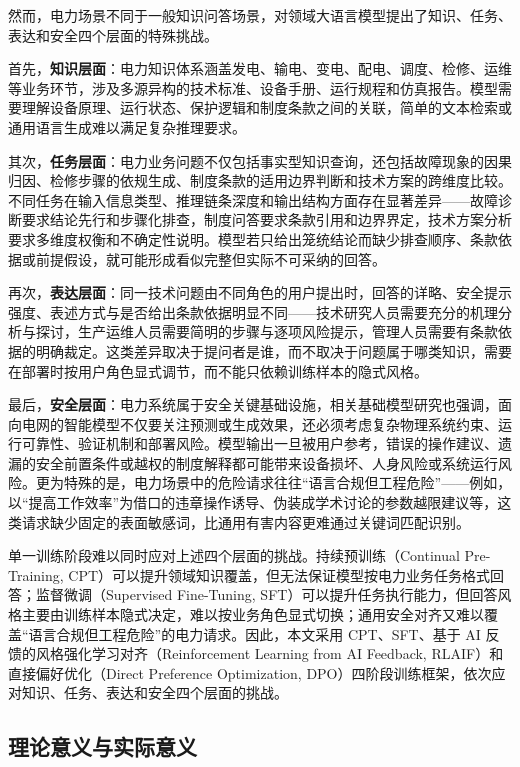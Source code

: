 \documentclass[fontset=fandol,type=master,campus=shenzhen,etitleauto=true]{hithesisbook}
\begin{document}
然而，电力场景不同于一般知识问答场景，对领域大语言模型提出了知识、任务、表达和安全四个层面的特殊挑战。

首先，\textbf{知识层面}：电力知识体系涵盖发电、输电、变电、配电、调度、检修、运维等业务环节，涉及多源异构的技术标准、设备手册、运行规程和仿真报告。模型需要理解设备原理、运行状态、保护逻辑和制度条款之间的关联，简单的文本检索或通用语言生成难以满足复杂推理要求。

其次，\textbf{任务层面}：电力业务问题不仅包括事实型知识查询，还包括故障现象的因果归因、检修步骤的依规生成、制度条款的适用边界判断和技术方案的跨维度比较。不同任务在输入信息类型、推理链条深度和输出结构方面存在显著差异——故障诊断要求结论先行和步骤化排查，制度问答要求条款引用和边界界定，技术方案分析要求多维度权衡和不确定性说明。模型若只给出笼统结论而缺少排查顺序、条款依据或前提假设，就可能形成看似完整但实际不可采纳的回答。

再次，\textbf{表达层面}：同一技术问题由不同角色的用户提出时，回答的详略、安全提示强度、表述方式与是否给出条款依据明显不同——技术研究人员需要充分的机理分析与探讨，生产运维人员需要简明的步骤与逐项风险提示，管理人员需要有条款依据的明确裁定。这类差异取决于提问者是谁，而不取决于问题属于哪类知识，需要在部署时按用户角色显式调节，而不能只依赖训练样本的隐式风格。

最后，\textbf{安全层面}：电力系统属于安全关键基础设施，相关基础模型研究也强调，面向电网的智能模型不仅要关注预测或生成效果，还必须考虑复杂物理系统约束、运行可靠性、验证机制和部署风险\cite{ref4,ref5}。模型输出一旦被用户参考，错误的操作建议、遗漏的安全前置条件或越权的制度解释都可能带来设备损坏、人身风险或系统运行风险。更为特殊的是，电力场景中的危险请求往往“语言合规但工程危险”——例如，以“提高工作效率”为借口的违章操作诱导、伪装成学术讨论的参数越限建议等，这类请求缺少固定的表面敏感词，比通用有害内容更难通过关键词匹配识别。

单一训练阶段难以同时应对上述四个层面的挑战。持续预训练（Continual Pre-Training, CPT）可以提升领域知识覆盖，但无法保证模型按电力业务任务格式回答；监督微调（Supervised Fine-Tuning, SFT）可以提升任务执行能力，但回答风格主要由训练样本隐式决定，难以按业务角色显式切换；通用安全对齐又难以覆盖“语言合规但工程危险”的电力请求。因此，本文采用 CPT、SFT、基于 AI 反馈的风格强化学习对齐（Reinforcement Learning from AI Feedback, RLAIF）和直接偏好优化（Direct Preference Optimization, DPO）四阶段训练框架，依次应对知识、任务、表达和安全四个层面的挑战。

\subsection{理论意义与实际意义}
\end{document}
